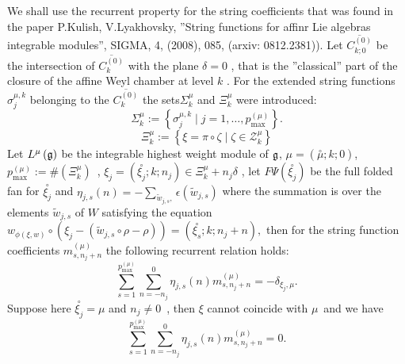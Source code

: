 \documentclass{article}
\begin{document}
We shall use the recurrent property for the string coefficients that was
found in the paper P.Kulish, V.Lyakhovsky, ''String functions for affinr Lie
algebras integrable modules'', SIGMA, 4, (2008), 085, (arxiv: 0812.2381)).
Let $\overline{C_{k;0}^{\left( 0\right) }}$ be the intersection of $%
\overline{C_{k}^{\left( 0\right) }}$ with the plane $\delta =0$ , that is
the ''classical'' part of the closure of the affine Weyl chamber at level $k$
. For the extended string functions $\sigma _{j}^{\mu ,k}$ belonging to the $%
\overline{C_{k}^{\left( 0\right) }}$ the sets$\Sigma _{k}^{\mu }$ and $\Xi
_{k}^{\mu }$ were introduced:
\begin{equation}
\Sigma _{k}^{\mu }:=\left\{ \sigma _{j}^{\mu ,k}\mid j=1,\ldots ,p_{\max
}^{\left( \mu \right) }\right\} .  \label{strings-for-mu}
\end{equation}
\begin{equation}
\Xi _{k}^{\mu }:=\left\{ \xi =\pi \circ \zeta \mid \zeta \in \mathcal{Z}%
_{k}^{\mu }\right\}  \label{maxes-for-mu}
\end{equation}
Let $L^{\mu }\left( \frak{g}\right) $ be the integrable highest weight
module of $\frak{g}$, $\mu =\left( \overset{\circ }{\mu };k;0\right) $, $%
p_{\max }^{\left( \mu \right) }:=\#\left( \Xi _{k}^{\mu }\right) $\ , $\xi
_{j}=\left( \overset{\circ }{\xi _{j}};k;n_{j}\right) \in \Xi _{k}^{\mu
}+n_{j}\delta $ , let $F\Psi \left( \overset{\circ }{\xi _{j}}\right) $ be
the full folded fan for $\overset{\circ }{\xi _{j}}$ and $\eta _{j,s}\left(
n\right) =-\sum_{\tilde{w}_{j,s},}\epsilon (\tilde{w}_{j,s})$ where the
summation is over the elements $\tilde{w}_{j,s}$ of $W$ satisfying the
equation $w_{\phi \left( \xi ,w\right) }\circ \left( \xi _{j}-\left( \tilde{w%
}_{j,s}\circ \rho -\rho \right) \right) =\left( \overset{\circ }{\xi _{s}}%
;k;n_{j}+n\right) ,$ then for the string function coefficients $%
m_{s,n_{j}+n}^{\left( \mu \right) }$ the following recurrent relation holds:
\begin{equation}
\sum_{s=1}^{p_{\max }^{\left( \mu \right) }}\sum_{n=-n_{j}}^{0}\eta
_{j,s}\left( n\right) m_{s,n_{j}+n}^{\left( \mu \right) }=-\delta _{\xi
_{j},\mu }.  \label{recursion-prop-string}
\end{equation}
Suppose here $\overset{\circ }{\xi _{j}}=\mu $ and $n_{j}\neq 0$\ , then $%
\xi $ cannot coincide with $\mu $\ and we have
\begin{equation*}
\sum_{s=1}^{p_{\max }^{\left( \mu \right) }}\sum_{n=-n_{j}}^{0}\eta
_{j,s}\left( n\right) m_{s,n_{j}+n}^{\left( \mu \right) }=0.
\end{equation*}
\end{document}
